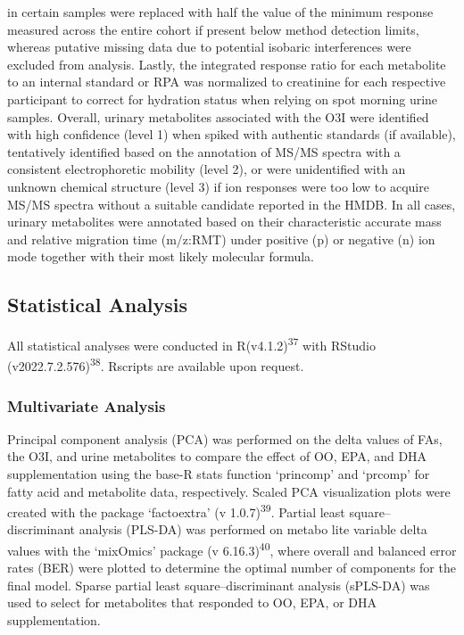 \documentclass[journal=jacsat,manuscript=article]{achemso}
\begin{document}
in certain samples were replaced with half the value of the minimum
response measured across the entire cohort if present below method
detection limits, whereas putative missing data due to potential
isobaric interferences were excluded from analysis. Lastly, the
integrated response ratio for each metabolite to an internal standard or
RPA was normalized to creatinine for each respective participant to
correct for hydration status when relying on spot morning urine samples.
Overall, urinary metabolites associated with the O3I were identified
with high confidence (level 1) when spiked with authentic standards (if
available), tentatively identified based on the annotation of MS/MS
spectra with a consistent electrophoretic mobility (level 2), or were
unidentified with an unknown chemical structure (level 3) if ion
responses were too low to acquire MS/MS spectra without a suitable
candidate reported in the HMDB. In all cases, urinary metabolites were
annotated based on their characteristic accurate mass and relative
migration time (m/z:RMT) under positive (p) or negative (n) ion mode
together with their most likely molecular formula.

\subsection{Statistical Analysis}\label{statistical-analysis}

All statistical analyses were conducted in R(v4.1.2)\textsuperscript{37}
with RStudio (v2022.7.2.576)\textsuperscript{38}. Rscripts are available
upon request.

\subsubsection{Multivariate Analysis}\label{multivariate-analysis}

Principal component analysis (PCA) was performed on the delta values of
FAs, the O3I, and urine metabolites to compare the effect of OO, EPA,
and DHA supplementation using the base-R stats function `princomp' and
`prcomp' for fatty acid and metabolite data, respectively. Scaled PCA
visualization plots were created with the package `factoextra' (v
1.0.7)\textsuperscript{39}. Partial least square--discriminant analysis
(PLS-DA) was performed on metabo lite variable delta values with the
`mixOmics' package (v 6.16.3)\textsuperscript{40}, where overall and
balanced error rates (BER) were plotted to determine the optimal number
of components for the final model. Sparse partial least
square--discriminant analysis (sPLS-DA) was used to select for
metabolites that responded to OO, EPA, or DHA supplementation.
\end{document}
